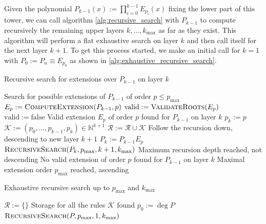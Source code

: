 \documentclass[a4paper,10pt]{article}
\begin{document}
Given the polynomial $P_{k-1}(x) := \prod_{i=0}^{k-1} E_{p_i}(x)$ fixing the lower part of this tower,
we can call algorithm \ref{alg:recursive_search} with $P_{k-1}$ to compute recursively the remaining
upper layers $k, \ldots, k_{\textrm{max}}$ as far as they exist. This algorithm will perform a
flat exhaustive search on layer $k$ and then call itself for the next layer $k+1$. To get this
process started, we make an initial call for $k=1$ with $P_{0} := P_n \equiv E_{p_0}$ as shown
in \ref{alg:exhaustive_recursive_search}.

\begin{algorithm}
  \caption{Recursive search for extensions over $P_{k-1}$ on layer $k$}
  \label{alg:recursive_search}
  \begin{algorithmic}
    \State {}
    \Comment Search for possible extensions of $P_{k-1}$ of order $p \leq p_{\textrm{max}}$
      \State $E_p := \textsc{ComputeExtension}(P_{k-1}, p)$
        \State $\mathrm{valid} := \textsc{ValidateRoots}(E_p)$
      \Else
        \State $\mathrm{valid} := \mathrm{false}$
      \EndIf
        \State {}
        \Comment Valid extension $E_p$ of order $p$ found for $P_{k-1}$ on layer $k$
        \State $p_k := p$
        \State $\mathcal{K} := (p_0, \ldots, p_{k-1}, p_k) \in \mathbb{N}^{k+1}$
        \State $\mathcal{R} := \mathcal{R} \cup \mathcal{K}$
          \State {}
          \Comment Follow the recursion down, descending to new layer $k+1$
          \State $P_{k} := P_{k-1} E_p$
          \State $\textsc{RecursiveSearch}(P_{k}, p_{\textrm{max}}, k+1, k_{\textrm{max}})$
        \Else
          \State {}
          \Comment Maximum recursion depth reached, not descending
        \EndIf
      \Else
        \State {}
        \Comment No valid extension of order $p$ found for $P_{k-1}$ on layer $k$
      \EndIf
    \EndFor
    \State {}
    \Comment Maximal extension order $p_{\textrm{max}}$ reached, ascending
    \EndProcedure
  \end{algorithmic}
\end{algorithm}

\begin{algorithm}
  \caption{Exhaustive recursive search up to $p_{\textrm{max}}$ and $k_{\textrm{max}}$}
  \label{alg:exhaustive_recursive_search}
  \begin{algorithmic}
      \State $\mathcal{R} := \{\}$
      \Comment Storage for all the rules $\mathcal{K}$ found
      \State $p_0 := \deg P$
      \State $\textsc{RecursiveSearch}(P, p_{\textrm{max}}, 1, k_{\textrm{max}})$
    \EndProcedure
  \end{algorithmic}
\end{algorithm}
\end{document}
